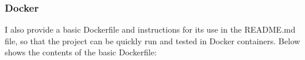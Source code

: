 \documentclass[./project-report/src/latex/project-report.tex]{subfiles}
\begin{document}
\inputminted{yaml}{./.github/workflows/tests.yml}

\subsubsection{Docker}

I also provide a basic Dockerfile and instructions for its use in the README.md file, so that the project can be quickly run and tested in Docker containers. Below 
shows the contents of the basic Dockerfile:

\inputminted{docker}{./Dockerfile}
\end{document}
